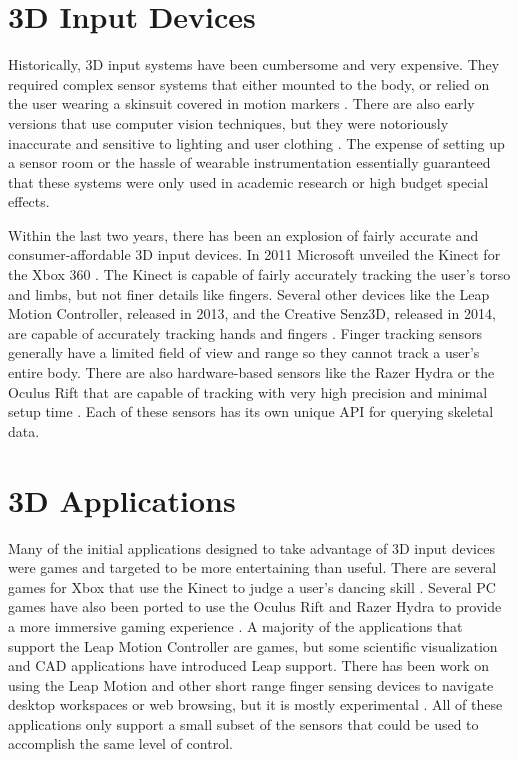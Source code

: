 \section{3D Input Devices}

Historically, 3D input systems have been cumbersome and very expensive. They required complex sensor systems that either mounted to the body, or relied on the user wearing a skinsuit covered in motion markers \cite{moeslund2006survey}. There are also early versions that use computer vision techniques, but they were notoriously inaccurate and sensitive to lighting and user clothing \cite{moeslund2006survey}. The expense of setting up a sensor room or the hassle of wearable instrumentation essentially guaranteed that these systems were only used in academic research or high budget special effects.

Within the last two years, there has been an explosion of fairly accurate and consumer-affordable 3D input devices. In 2011 Microsoft unveiled the Kinect for the Xbox 360 \cite{kinectlaunch}. The Kinect is capable of fairly accurately tracking the user's torso and limbs, but not finer details like fingers. Several other devices like the Leap Motion Controller, released in 2013,  and the Creative Senz3D, released in 2014, are capable of accurately tracking hands and fingers \cite{weichert2013analysis,kratz2013depth}. Finger tracking sensors generally have a limited field of view and range so they cannot track a user’s entire body. There are also hardware-based sensors like the Razer Hydra or the Oculus Rift that are capable of tracking with very high precision and minimal setup time \cite{basu2012immersive}. Each of these sensors has its own unique API for querying skeletal data.

\section{3D Applications}

Many of the initial applications designed to take advantage of 3D input devices were games and targeted to be more entertaining than useful. There are several games for Xbox that use the Kinect to judge a user’s dancing skill \cite{kinect_dance}. Several PC games have also been ported to use the Oculus Rift and Razer Hydra to provide a more immersive gaming experience \cite{rift_hydra}. A majority of the applications that support the Leap Motion Controller are games, but some scientific visualization and CAD applications have introduced Leap support. There has been work on using the Leap Motion and other short range finger sensing devices to navigate desktop workspaces or web browsing, but it is mostly experimental \cite{moyle2003design}. All of these applications only support a small subset of the sensors that could be used to accomplish the same level of control.

